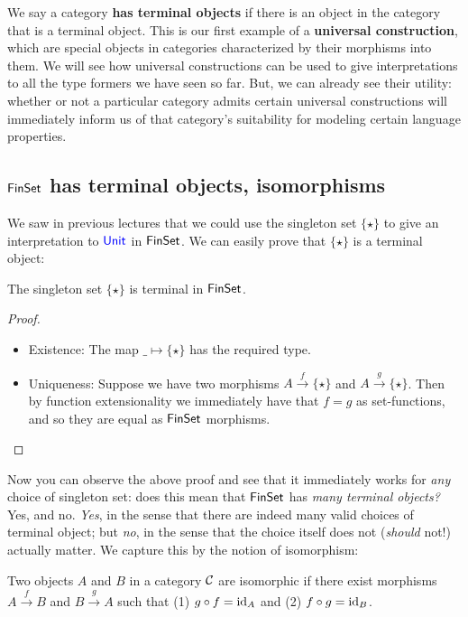 We say a category \textbf{has terminal objects} if there is an object in the
category that is a terminal object. This is our first example of a 
\textbf{universal construction}, which are special objects in categories 
characterized by their morphisms into them. We will see how universal 
constructions can be used to give interpretations to all the type 
formers we have seen so far. But, we can already see their utility: 
whether or not a particular category admits certain universal constructions
will immediately inform us of that category's suitability for modeling 
certain language properties.

\subsection{$\mathsf{FinSet}$ has terminal objects, isomorphisms}
We saw in previous lectures that we could use the singleton set 
$\{\star\}$ to give an interpretation to $\mathsf{{\color{blue}Unit}}$ in $\mathsf{FinSet}$.
We can easily prove that $\{\star\}$ is a terminal object:
\begin{theorem}
  The singleton set $\{\star\}$ is terminal in $\mathsf{FinSet}$.
\end{theorem}
\begin{proof}
  \begin{itemize}
    \item Existence: The map $\_ \mapsto \{\star\}$ has the required type.
    \item Uniqueness: Suppose we have two morphisms $A \xrightarrow{f} \{\star\}$ and
    $A \xrightarrow{g} \{\star\}$. 
    Then by function extensionality we immediately have that $f = g$ 
    as set-functions, and so they are equal as $\mathsf{FinSet}$ morphisms.
  \end{itemize}
\end{proof}

Now you can observe the above proof and see that it immediately 
works for \emph{any} choice of singleton set: does this mean that $\mathsf{FinSet}$
has \emph{many terminal objects?} Yes, and no. \emph{Yes}, in the sense 
that there are indeed many valid choices of terminal object; but \emph{no}, 
in the sense that the choice itself does not (\emph{should} not!) actually 
matter. We capture this by the notion of isomorphism:

\begin{definition}
  \sloppy
  Two objects $A$ and $B$ in a category $\mathcal C$ are isomorphic if 
  there exist morphisms $A \xrightarrow{f} B$ and $B \xrightarrow{g} A$
  such that (1) $g \circ f = \operatorname{id}_A$ and (2) $f \circ g = \operatorname{id}_B$.
\end{definition}

